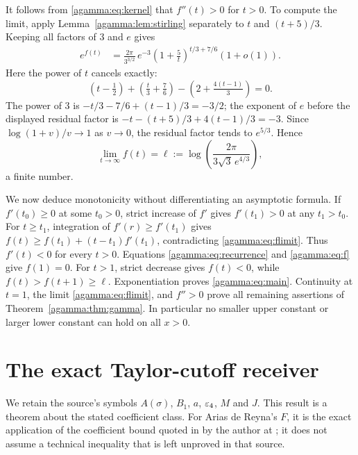 It follows from \eqref{agamma:eq:kernel} that $f''(t)>0$ for $t>0$.
To compute the limit, apply Lemma~\ref{agamma:lem:stirling} separately to
$t$ and $(t+5)/3$. Keeping all factors of $3$ and $e$ gives
\begin{align}
e^{f(t)}
&=\frac{2\pi}{3^{3/2}}\,e^{-3}
\left(1+\frac5t\right)^{t/3+7/6}(1+o(1)).\label{agamma:eq:ratio-asymptotic}
\end{align}
Here the power of $t$ cancels exactly:
\[
(t-\tfrac12)+(\tfrac t3+\tfrac76)
-\left(2+\tfrac{4(t-1)}3\right)=0.
\]
The power of $3$ is $-t/3-7/6+(t-1)/3=-3/2$; the exponent of $e$
before the displayed residual factor is
$-t-(t+5)/3+4(t-1)/3=-3$.
Since $\log(1+v)/v\to1$ as $v\to0$, the residual factor tends
to $e^{5/3}$. Hence
\begin{equation}\label{agamma:eq:flimit}
\lim_{t\to\infty}f(t)=
\ell:=\log\left(\frac{2\pi}{3\sqrt3\,e^{4/3}}\right),
\end{equation}
a finite number.

We now deduce monotonicity without differentiating an asymptotic
formula. If $f'(t_0)\ge0$ at some $t_0>0$, strict increase of $f'$
gives $f'(t_1)>0$ at any $t_1>t_0$. For $t\ge t_1$, integration
of $f'(r)\ge f'(t_1)$ gives
$f(t)\ge f(t_1)+(t-t_1)f'(t_1)$, contradicting \eqref{agamma:eq:flimit}.
Thus $f'(t)<0$ for every $t>0$. Equations \eqref{agamma:eq:recurrence}
and \eqref{agamma:eq:f} give $f(1)=0$. For $t>1$, strict decrease gives
$f(t)<0$, while $f(t)>f(t+1)\ge\ell$. Exponentiation proves
\eqref{agamma:eq:main}. Continuity at $t=1$, the limit \eqref{agamma:eq:flimit},
and $f''>0$ prove all remaining assertions of
Theorem~\ref{agamma:thm:gamma}. In particular no smaller upper constant
or larger lower constant can hold on all $x>0$.

\section{The exact Taylor-cutoff receiver}\label{agamma:sec:taylor}
We retain the source's symbols $A(\sigma)$, $B_1$, $a$,
$\varepsilon_4$, $M$ and $J$. This result is a theorem about the stated
coefficient class. For Arias de Reyna's $F$, it is the exact
application of the coefficient bound quoted in
\cite[formulas (47) and (56)]{agamma:AriasI} by the author at
\cite[\texttt{PropAprTaylor}]{agamma:AriasII}; it does not assume a
technical inequality that is left unproved in that source.

